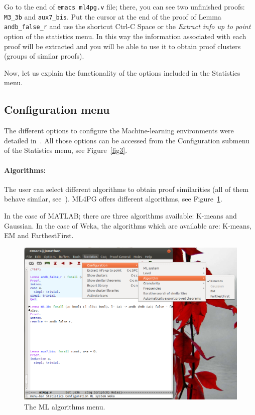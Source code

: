 \documentclass[10pt]{article}
\begin{document}
Go to the end of \verb"emacs ml4pg.v" file; there, you can see two unfinished proofs: \verb"M3_3b" and \verb"aux7_bis". Put the cursor at the end of 
the proof of Lemma \verb"andb_false_r" and use the shortcut Ctrl-C Space or the \emph{Extract info up to point} option of the statistics menu. In this 
way the information associated with each proof will be extracted and you will be able to use it to obtain proof clusters (groups of similar proofs).

Now, let us explain the functionality of the options included in the Statistics menu. 

\subsection{Configuration menu}

The different options to configure the Machine-learning environments were detailed in~\cite{KHG12}. All those options can be accessed from the Configuration 
submenu of the Statistics menu, see Figure~\ref{fig3}. 



\paragraph{Algorithms:}

The user can select different algorithms to obtain proof similarities (all of them behave similar, see~\cite{HK13}).
ML4PG offers different algorithms, see Figure~\ref{algorithms}. 

In the case of MATLAB; there are three algorithms available: K-means and Gaussian. In the case of Weka, the algorithms 
which are available are: K-means, EM and FarthestFirst. 

\begin{figure}
 \centering
 \includegraphics[scale=0.4]{images/algorithm2.png}
 \caption{The ML algorithms menu.}\label{algorithms}
\end{figure}
\end{document}
